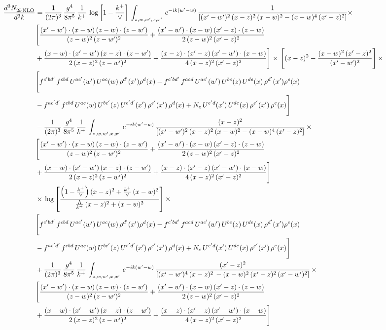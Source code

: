 \documentclass[9pt]{article}
\numberwithin{equation}{section}
\begin{document}
\begin{align} 
    \frac{d^{3}N_{2b\,\rm NLO}^{\rm}}{d^{3}k}  & = \frac{1}{(2\pi)^{3}}\, \frac{g^{4}}{8\pi^{5}}\,\frac{1}{k^{+}}\, \log{\left[1-\frac{k^{+}}{\vee}\right]}\,\int_{z,w,w^{\prime},x,x'}\, e^{-ik(w^{\prime}-w)}\, \frac{1}{\left[(x'-w')^{2}\,(x-z)^{2}\,(x-w)^{2} - (x-w)^{4}\, (x'-z)^{2}\right]} \times\notag \\ & \Bigg[\frac{(x'-w')\cdot (x-w)\, (z-w)\cdot (z-w')}{(z-w)^{2}\, (z-w')^{2}}+\frac{(x'-w')\cdot (x-w)\, (x'-z)\cdot (z-w)}{2\, (z-w)^{2}\, (x'-z)^{2}}\notag \\ & +\frac{(x-w)\cdot (x'-w')\, (x-z)\cdot (z-w')}{2\, (x-z)^{2}\, (z-w')^{2}}+\frac{(x-z)\cdot (x'-z)\, (x'-w')\cdot (x-w)}{4\, (x-z)^{2}\, (x'-z)^{2}}\Bigg] \times\,\Bigg[(x-z)^{2} - \frac{(x-w)^{2}\, (x'-z)^{2}}{(x'-w')^{2}}\Bigg]\,\times \notag \\ & \Bigg[f^{c'bd'}\,f^{cbd}\, U^{ac'}(w')\,U^{ac}(w)\,\rho^{d'}(x')\rho^{d}(x)- f^{c'bd'}\,f^{acd}\,U^{ac'}(w')\,U^{bc}(z)\,U^{de}(x)\,\rho^{d'}(x')\rho^{e}(x) \notag \\ & -f^{ac'd'}\,f^{cbd}\,U^{ac}(w)\,U^{bc'}(z)\,U^{e'd'}(x')\,\rho^{e'}(x')\,\rho^{d}(x) +N_{c}\,U^{e'd}(x')\,U^{de}(x)\,\rho^{e'}(x')\,\rho^{e}(x)\Bigg]\notag \\ &  - \frac{1}{(2\pi)^{3}}\, \frac{g^{4}}{8\pi^{5}}\,\frac{1}{k^{+}}\,\int_{z,w,w^{\prime},x,x'}\, e^{-ik(w^{\prime}-w)}\, \frac{(x-z)^{2}}{\left[(x'-w')^{2}\,(x-z)^{2}\,(x-w)^{2} - (x-w)^{4}\, (x'-z)^{2}\right]}\,  \times\notag \\ & \Bigg[\frac{(x'-w')\cdot (x-w)\, (z-w)\cdot (z-w')}{(z-w)^{2}\, (z-w')^{2}}+\frac{(x'-w')\cdot (x-w)\, (x'-z)\cdot (z-w)}{2\, (z-w)^{2}\, (x'-z)^{2}}\notag \\ & +\frac{(x-w)\cdot (x'-w')\, (x-z)\cdot (z-w')}{2\, (x-z)^{2}\, (z-w')^{2}}+\frac{(x-z)\cdot (x'-z)\, (x'-w')\cdot (x-w)}{4\, (x-z)^{2}\, (x'-z)^{2}}\Bigg] \notag \\ & \times\,\log{\left[\frac{\left(1-\frac{k^{+}}{\vee}\right)(x-z)^{2}+\frac{k^{+}}{\vee}\,(x-w)^{2}}{\frac{\Lambda}{k^{+}}\,(x-z)^{2}+(x-w)^{2}}\right]}\,\times \notag \\ & \Bigg[f^{c'bd'}\,f^{cbd}\, U^{ac'}(w')\,U^{ac}(w)\,\rho^{d'}(x')\rho^{d}(x)- f^{c'bd'}\,f^{acd}\,U^{ac'}(w')\,U^{bc}(z)\,U^{de}(x)\,\rho^{d'}(x')\rho^{e}(x) \notag \\ & -f^{ac'd'}\,f^{cbd}\,U^{ac}(w)\,U^{bc'}(z)\,U^{e'd'}(x')\,\rho^{e'}(x')\,\rho^{d}(x) +N_{c}\,U^{e'd}(x')\,U^{de}(x)\,\rho^{e'}(x')\,\rho^{e}(x)\Bigg]\notag \\ &  + \frac{1}{(2\pi)^{3}}\, \frac{g^{4}}{8\pi^{5}}\,\frac{1}{k^{+}}\,\int_{z,w,w^{\prime},x,x'}\, e^{-ik(w^{\prime}-w)}\, \frac{(x'-z)^{2}}{\left[(x'-w')^{4}\,(x-z)^{2}\, - (x-w)^{2}\, (x'-z)^{2}\,(x'-w')^{2}\right]}\,  \times\notag \\ & \Bigg[\frac{(x'-w')\cdot (x-w)\, (z-w)\cdot (z-w')}{(z-w)^{2}\, (z-w')^{2}}+\frac{(x'-w')\cdot (x-w)\, (x'-z)\cdot (z-w)}{2\, (z-w)^{2}\, (x'-z)^{2}}\notag \\ & +\frac{(x-w)\cdot (x'-w')\, (x-z)\cdot (z-w')}{2\, (x-z)^{2}\, (z-w')^{2}}+\frac{(x-z)\cdot (x'-z)\, (x'-w')\cdot (x-w)}{4\, (x-z)^{2}\, (x'-z)^{2}}\Bigg] \notag \\ & 
\end{align}
\end{document}
